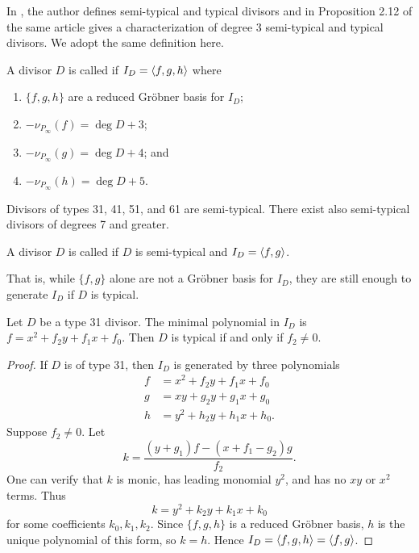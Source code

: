 In \cite{kmakdisi18}, the author defines semi-typical and typical divisors
and in Proposition 2.12 of the same article gives a characterization of degree 3 semi-typical and typical divisors.
We adopt the same definition here.
\begin{definition}
  A divisor $D$ is called  if $I_D = \left\langle f, g, h \right\rangle$ where
  \begin{enumerate}[label=(\roman*)]
    \item $\{f, g, h\}$ are a reduced Gr\"obner basis for $I_D$;
    \item $-\nu_{P_\infty}(f) = \deg D + 3$;
    \item $-\nu_{P_\infty}(g) = \deg D + 4$; and
    \item $-\nu_{P_\infty}(h) = \deg D + 5$.
  \end{enumerate}
\end{definition}
Divisors of types 31, 41, 51, and 61 are semi-typical.
There exist also semi-typical divisors of degrees 7 and greater.
\begin{definition}
  A divisor $D$ is called  if $D$ is semi-typical and $I_D = \left\langle f, g \right\rangle$.
\end{definition}
That is, while $\{f, g\}$ alone are not a Gr\"obner basis for $I_D$,
they are still enough to generate $I_D$ if $D$ is typical.

\begin{proposition}
  Let $D$ be a type 31 divisor.
  The minimal polynomial in $I_D$ is $f = x^2 + f_2y + f_1x + f_0$.
  Then $D$ is typical if and only if $f_2 \neq 0$.
\end{proposition}
\begin{proof}
  If $D$ is of type 31, then $I_D$ is generated by three polynomials
  \begin{align*}
    f &= x^2 + f_2y + f_1x + f_0 \\
    g &= xy  + g_2y + g_1x + g_0 \\
    h &= y^2 + h_2y + h_1x + h_0.
  \end{align*}
  Suppose $f_2 \neq 0$. Let
  \[ k = \frac {(y + g_1)f - (x + f_1 - g_2)g} {f_2}. \]
  One can verify that $k$ is monic, has leading monomial $y^2$,
  and has no $xy$ or $x^2$ terms. Thus
  \[ k = y^2 + k_2y + k_1x + k_0 \]
  for some coefficients $k_0, k_1, k_2$.
  Since $\{f,g,h\}$ is a reduced Gr\"obner basis, $h$ is the unique polynomial of this form, so $k = h$.
  Hence $I_D = \left\langle f,g,h \right\rangle = \left\langle f,g \right\rangle$.
\end{proof}


